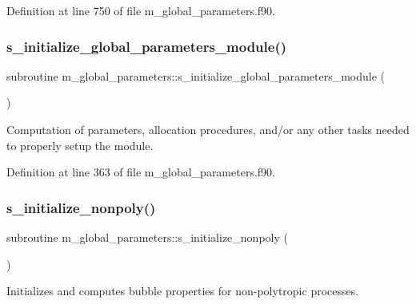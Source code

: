 Definition at line 750 of file m\+\_\+global\+\_\+parameters.\+f90.

\mbox{\label{namespacem__global__parameters_a8a76198d180cb9736c21dde108cb0dbf}} 
\subsubsection{\texorpdfstring{s\+\_\+initialize\+\_\+global\+\_\+parameters\+\_\+module()}{s\_initialize\_global\_parameters\_module()}}
{\footnotesize\ttfamily subroutine m\+\_\+global\+\_\+parameters\+::s\+\_\+initialize\+\_\+global\+\_\+parameters\+\_\+module (\begin{DoxyParamCaption}{ }\end{DoxyParamCaption})}



Computation of parameters, allocation procedures, and/or any other tasks needed to properly setup the module. 



Definition at line 363 of file m\+\_\+global\+\_\+parameters.\+f90.

\mbox{\label{namespacem__global__parameters_a1611e2cf82243c04b04a11281ef67993}} 
\subsubsection{\texorpdfstring{s\+\_\+initialize\+\_\+nonpoly()}{s\_initialize\_nonpoly()}}
{\footnotesize\ttfamily subroutine m\+\_\+global\+\_\+parameters\+::s\+\_\+initialize\+\_\+nonpoly (\begin{DoxyParamCaption}{ }\end{DoxyParamCaption})}



Initializes and computes bubble properties for non-\/polytropic processes. 



